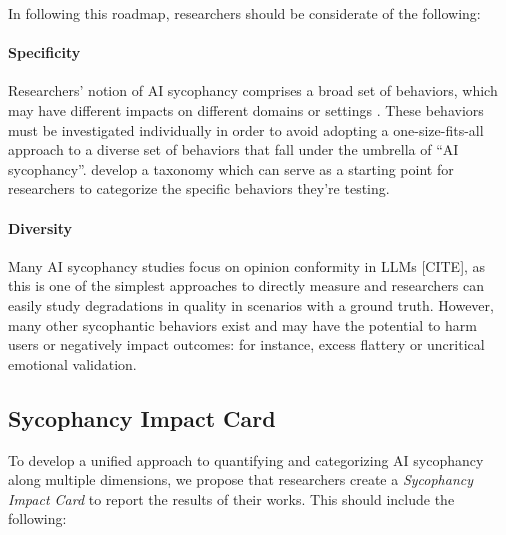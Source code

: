 \noindent In following this roadmap, researchers should be considerate of the following:

\paragraph{Specificity} Researchers' notion of AI sycophancy comprises a broad set of behaviors, which may have different impacts on different domains or settings \cite{ye2026countsaisycophancytaxonomy}. These behaviors must be investigated individually in order to avoid adopting a one-size-fits-all approach to a diverse set of behaviors that fall under the umbrella of ``AI sycophancy''. \citet{ye2026countsaisycophancytaxonomy} develop a taxonomy which can serve as a starting point for researchers to categorize the specific behaviors they're testing.

\paragraph{Diversity} Many AI sycophancy studies focus on opinion conformity in LLMs [CITE], as this is one of the simplest approaches to directly measure and researchers can easily study degradations in quality in scenarios with a ground truth. However, many other sycophantic behaviors exist and may have the potential to harm users or negatively impact outcomes: for instance, excess flattery or uncritical emotional validation.

\subsection{Sycophancy Impact Card}
\label{sec:impact-card}
To develop a unified approach to quantifying and categorizing AI sycophancy along multiple dimensions, we propose that researchers create a \emph{Sycophancy Impact Card} to report the results of their works. This should include the following: 

